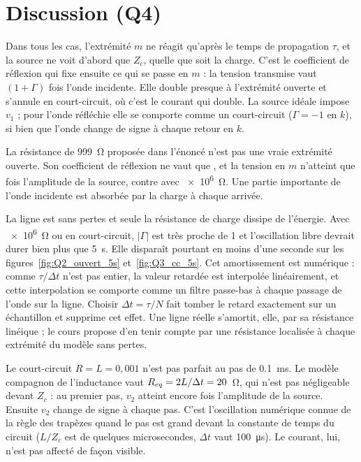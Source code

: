 \section{Discussion (Q4)}

Dans tous les cas, l'extrémité $m$ ne réagit qu'après le temps de propagation $\tau$, et la
source ne voit d'abord que $Z_c$, quelle que soit la charge. C'est le coefficient de réflexion qui
fixe ensuite ce qui se passe en $m$ : la tension transmise vaut $(1+\Gamma)$ fois l'onde
incidente. Elle double presque à l'extrémité ouverte et s'annule en court-circuit, où c'est le
courant qui double. La source idéale impose $v_1$ ; pour l'onde réfléchie elle se comporte comme
un court-circuit ($\Gamma = -1$ en $k$), si bien que l'onde change de signe à chaque retour en $k$.

La résistance de 999~\unit{\ohm} proposée dans l'énoncé n'est pas une vraie extrémité ouverte.
Son coefficient de réflexion ne vaut que \Gneuf, et la tension en $m$ n'atteint que \rapNeuf{}
fois l'amplitude de la source, contre \rapMega{} avec \SI{e6}{\ohm}. Une partie importante de
l'onde incidente est absorbée par la charge à chaque arrivée.

La ligne est sans pertes et seule la résistance de charge dissipe de l'énergie. Avec
\SI{e6}{\ohm} ou en court-circuit, $|\Gamma|$ est très proche de 1 et l'oscillation libre
devrait durer bien plus que 5~s. Elle disparaît pourtant en moins d'une seconde sur les
figures~\ref{fig:Q2_ouvert_5s} et~\ref{fig:Q3_cc_5s}. Cet amortissement est numérique : comme
$\tau/\Delta t$ n'est pas entier, la valeur retardée est interpolée linéairement, et cette
interpolation se comporte comme un filtre passe-bas à chaque passage de l'onde sur la ligne.
Choisir $\Delta t = \tau/N$ fait tomber le retard exactement sur un échantillon et supprime cet
effet. Une ligne réelle s'amortit, elle, par sa résistance linéique ; le cours propose d'en tenir
compte par une résistance localisée à chaque extrémité du modèle sans pertes.

Le court-circuit $R = L = 0{,}001$ n'est pas parfait au pas de \SI{0.1}{ms}. Le modèle compagnon
de l'inductance vaut $R_{eq} = 2L/\Delta t = 20$~\unit{\ohm}, qui n'est pas négligeable devant
$Z_c$ : au premier pas, $v_2$ atteint encore \rapCC{} fois l'amplitude de la source. Ensuite $v_2$
change de signe à chaque pas. C'est l'oscillation numérique connue de la règle des trapèzes
quand le pas est grand devant la constante de temps du circuit ($L/Z_c$ est de quelques
microsecondes, $\Delta t$ vaut \SI{100}{\micro s}). Le courant, lui, n'est pas affecté de façon
visible.

